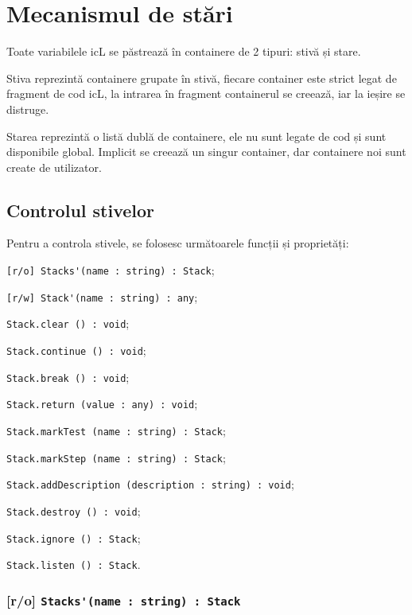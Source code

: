 \section{Mecanismul de stări}

Toate variabilele icL se păstrează în containere de 2 tipuri: stivă și stare.

Stiva reprezintă containere grupate în stivă, fiecare container este strict legat de fragment de cod icL, la intrarea în fragment containerul se creează, iar la ieșire se distruge.

Starea reprezintă o listă dublă de containere, ele nu sunt legate de cod și sunt disponibile global. Implicit se creează un singur container, dar containere noi sunt create de utilizator.

\subsection{Controlul stivelor}

Pentru a controla stivele, se folosesc următoarele funcții și proprietăți:
\begin{icItems}
	\item \lstinline|[r/o] Stacks'(name : string) : Stack|;
	\item \lstinline|[r/w] Stack'(name : string) : any|;
	\item \lstinline|Stack.clear () : void|;
	\item \lstinline|Stack.continue () : void|;
	\item \lstinline|Stack.break () : void|;
	\item \lstinline|Stack.return (value : any) : void|;
	\item \lstinline|Stack.markTest (name : string) : Stack|;
	\item \lstinline|Stack.markStep (name : string) : Stack|;
	\item \lstinline|Stack.addDescription (description : string) : void|;
	\item \lstinline|Stack.destroy () : void|;
	\item \lstinline|Stack.ignore () : Stack|;
	\item \lstinline|Stack.listen () : Stack|.
\end{icItems}

\subsubsection{[r/o] \lstinline|Stacks'(name : string) : Stack|}

